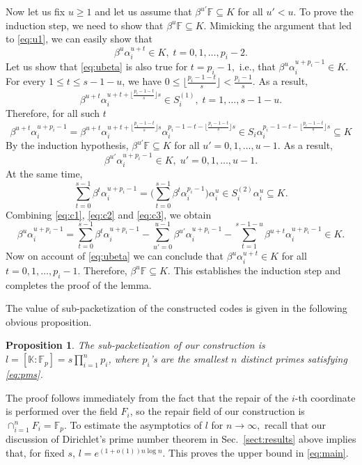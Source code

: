 \documentclass[11pt,onecolumn]{IEEEtran}
\newtheorem{proposition}{Proposition}
\begin{document}
\begin{IEEEproof}
Now let us fix $u\ge 1$ and let us assume that $\beta^{u'}\mathbb{F} \subseteq K$ for all $u'<u.$ To prove the induction step, we need to show that $\beta^{u}\mathbb{F}\subseteq K$.
Mimicking the argument that led to \eqref{eq:u1}, we can easily show that
\begin{equation}\label{eq:ubeta}
\beta^u\alpha_i^{u+t} \in K,\; t=0,1,\dots, p_i-2.
\end{equation}
Let us show that \eqref{eq:ubeta} is also true for $t=p_i-1,$ i.e., that $\beta^u\alpha_i^{u+p_i-1} \in K$.
For every $1 \le t \le s-1-u$, we have $0\le \lfloor \frac{p_i-1-t}{s} \rfloor <\frac{p_i-1}{s}$.
As a result,
$$
\beta^{u+t} \alpha_i^{u+t+ \lfloor \frac{p_i-1-t}{s} \rfloor s} \in S_i^{(1)},\; t=1,\dots, s-1-u.
$$
Therefore, for all such $t$
\begin{equation}\label{eq:c1}
\beta^{u+t} \alpha_i^{u+p_i-1} = 
\beta^{u+t} \alpha_i^{u+t+ \lfloor \frac{p_i-1-t}{s} \rfloor s} 
\alpha_i^{p_i-1-t - \lfloor \frac{p_i-1-t}{s} \rfloor s} 
  \in S_i  \alpha_i^{p_i-1-t - \lfloor \frac{p_i-1-t}{s} \rfloor s} \subseteq K
\end{equation}
By the induction hypothesis, $\beta^{u'} \mathbb{F} \subseteq K$ for all $u'=0,1,\dots,u-1.$ As a result,
\begin{equation}\label{eq:c2}
\beta^{u'} \alpha_i^{u+p_i-1} \in K,\; u'=0,1,\dots,u-1.
\end{equation}
At the same time,
\begin{equation}\label{eq:c3}
\sum_{t=0}^{s - 1}\beta^t \alpha_i^{u+p_i-1}
= \Big( \sum_{t=0}^{s - 1}\beta^t \alpha_i^{p_i-1} \Big) \alpha_i^u
\in S_i^{(2)} \alpha_i^u \subseteq K.
\end{equation}
Combining \eqref{eq:c1}, \eqref{eq:c2} and \eqref{eq:c3}, we obtain
$$
\beta^u\alpha_i^{u+p_i-1}
= \sum_{t=0}^{s - 1}\beta^t \alpha_i^{u+p_i-1}
- \sum_{u'=0}^{u-1} \beta^{u'} \alpha_i^{u+p_i-1}
- \sum_{t=1}^{s-1-u} \beta^{u+t} \alpha_i^{u+p_i-1}
\in K.
$$
Now on account of \eqref{eq:ubeta} we can conclude that
$\beta^u\alpha_i^{u+t} \in K$  for all $ t =0,1,\dots, p_i-1.$
Therefore, $\beta^u\mathbb{F} \subseteq K$.
This establishes the induction step and completes the proof of the lemma.
\end{IEEEproof}


The value of sub-packetization of the constructed codes is given in the following obvious proposition.

\begin{proposition}
The sub-packetization of our construction is 
$l=[\mathbb{K}:\mathbb{F}_p]=s\prod_{i=1}^n p_i$, where $p_i$'s are the smallest $n$ distinct primes satisfying \eqref{eq:pms}. 
\end{proposition}
The proof follows immediately from the fact that the repair of the $i$-th coordinate is performed over the field $F_i$, so the repair field of our construction is $\cap_{i=1}^n F_i = \mathbb{F}_p$. To estimate the asymptotics of $l$ for $n\to\infty,$ 
recall that our discussion of Dirichlet's prime number theorem in Sec.~\ref{sect:results} above implies that, for fixed $s$, $l= e^{(1+o(1)) n\log n}$. This proves the upper bound in \eqref{eq:main}.
\end{document}
